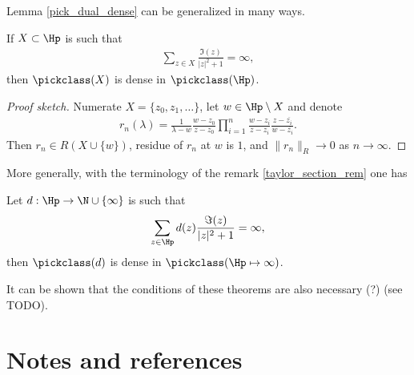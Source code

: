 \begin{huom}
	Lemma \ref{pick_dual_dense} can be generalized in many ways.
	\begin{prop}
		If $X \subset \Hp$ is such that
		\begin{align*}
			\sum_{z \in X} \frac{\Im(z)}{|z|^2 + 1} = \infty,
		\end{align*}
		then $\pickclass(X)$ is dense in $\pickclass(\Hp)$.
	\end{prop}
	\begin{proof}[Proof sketch]
		Numerate $X = \{z_{0}, z_{1}, \ldots \}$, let $w \in \Hp \setminus X$ and denote
		\begin{align*}
			r_{n}(\lambda) = \frac{1}{\lambda - w} \frac{w - z_{0}}{z - z_{0}} \prod_{i = 1}^{n} \frac{w - z_{i}}{z - z_{i}} \frac{z - \overline{z_{i}}}{w - \overline{z_{i}}}.
		\end{align*}
		Then $r_{n} \in R(X \cup \{w\})$, residue of $r_{n}$ at $w$ is $1$, and $\|r_{n}\|_{R} \to 0$ as $n \to \infty$.
	\end{proof}
	More generally, with the terminology of the remark \ref{taylor_section_rem} one has
	\begin{prop}
		Let $d : \Hp \to \N \cup \{\infty\}$ is such that
		\begin{align*}
			\sum_{z \in \Hp} d(z) \frac{\Im(z)}{|z|^2 + 1} = \infty,
		\end{align*}
		then $\pickclass(d)$ is dense in $\pickclass(\Hp \mapsto \infty)$.
	\end{prop}

	It can be shown that the conditions of these theorems are also necessary (?) (see TODO).
\end{huom}

\section{Notes and references}

